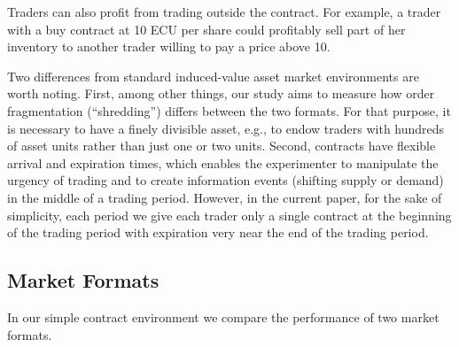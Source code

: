 \documentclass[12pt]{article}
\begin{document}
Traders can also profit from trading outside the contract. For example, a trader with a buy contract at 10 ECU per share could profitably sell part of her inventory to another trader willing to pay a price above 10. 

Two differences from standard induced-value asset market environments are worth noting. First, among other things, our study aims to measure how order fragmentation (``shredding'') differs between the two formats. For that purpose, it is necessary to have a finely divisible asset, e.g., to endow traders with hundreds of asset units rather than just one or two units.  
Second, contracts  have flexible arrival and expiration times, which enables the experimenter to manipulate the urgency of trading and to create information events (shifting supply or demand) in the middle of a trading period. However, in the current paper, for the sake of simplicity, each period we give each trader only a single contract at the beginning of the trading period with expiration very near the end of the trading period. 


\subsection{Market Formats}\label{sect:formatimp}
In our simple contract environment we compare the performance of two market formats. 
\end{document}
